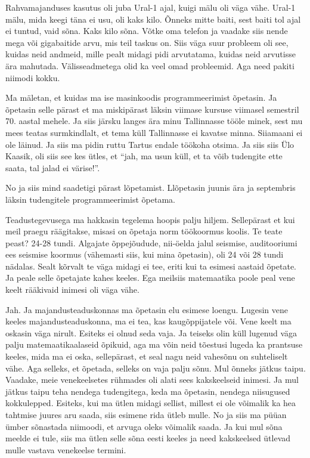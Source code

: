 Rahvamajanduses kasutus oli juba Ural-1 ajal, kuigi mälu oli väga vähe. Ural-1 mälu, mida keegi täna ei usu, oli kaks kilo. Õnneks mitte baiti, sest baiti tol ajal ei tuntud, vaid sõna. Kaks kilo sõna. Võtke oma telefon ja vaadake siis nende mega või gigabaitide arvu, mis teil taskus on. Siis väga suur probleem oli see, kuidas neid andmeid, mille pealt midagi pidi arvutatama, kuidas neid  arvutisse ära mahutada. Välisseadmetega olid ka veel omad probleemid. Aga need pakiti niimodi kokku. 

Ma mäletan, et kuidas ma ise masinkoodis programmeerimist õpetasin. Ja õpetasin selle pärast et ma miskipärast läksin viimase kursuse viimasel semestril 70. aastal mehele. Ja siis järsku langes ära minu Tallinnasse tööle minek, sest mu mees teatas surmkindlalt, et tema küll Tallinnasse ei kavatse minna. Siiamaani ei ole läinud. Ja siis  ma pidin ruttu Tartus endale töökoha otsima. Ja siis siis Ülo Kaasik,  oli siis see kes ütles, et \enquote{jah, ma usun küll, et ta võib tudengite ette saata, tal jalad ei värise!}. 

No ja siis mind saadetigi pärast lõpetamist. Llõpetasin juunis ära ja  septembris läksin tudengitele programmeerimist õpetama. 


Teadustegevusega ma hakkasin tegelema hoopis palju hiljem. Sellepärast et kui meil praegu räägitakse,  misasi on õpetaja norm töökoormus koolis. Te teate peast? 24-28 tundi. Algajate õppejõudude, nii-öelda jalul seismise, auditooriumi ees seismise koormus (vähemasti siis, kui mina õpetasin), oli 24 või 28 tundi nädalas. Sealt kõrvalt te väga midagi ei tee, eriti kui ta esimesi aastaid õpetate. Ja peale selle õpetajate kahes keeles. Ega meilsiis matemaatika poole peal vene keelt rääkivaid inimesi oli väga vähe. 


Jah. Ja majandusteaduskonnas ma õpetasin elu esimese loengu. Lugesin vene keeles majandusteaduskonna, ma ei tea, kas kaugõppijatele või. Vene keelt ma oskasin väga nirult. Esiteks ei olnud seda vaja. Ja teiseks olin küll lugenud väga palju matemaatikaalaseid õpikuid, aga ma võin neid tõestusi lugeda ka prantsuse keeles, mida ma ei oska, sellepärast, et seal nagu neid vahesõnu on suhteliselt vähe. Aga selleks, et õpetada, selleks on vaja palju sõnu. Mul õnneks jätkus taipu. Vaadake, meie venekeelsetes rühmades oli alati sees kakskeelseid inimesi. Ja mul jätkus taipu teha nendega tudengitega, keda ma õpetasin, nendega niisugused kokkulepped. Esiteks, kui ma ütlen midagi sellist, millest ei ole võimalik ka hea tahtmise juures aru saada, siis esimene rida ütleb mulle. No ja siis ma püüan ümber sõnastada niimoodi, et arvuga oleks võimalik saada. Ja kui mul sõna meelde ei tule, siis ma ütlen selle sõna eesti keeles ja need kakskeelsed ütlevad mulle vastava venekeelse termini. 

